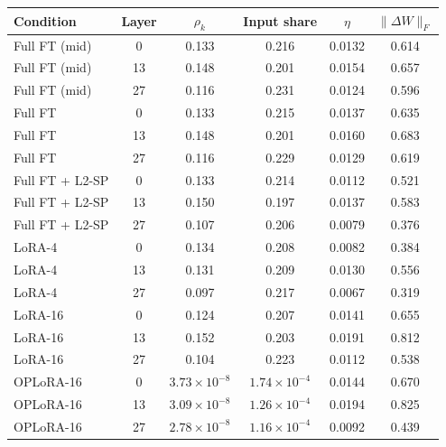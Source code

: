 \begin{tabular}{lccccc}
\toprule
Condition & Layer & $\rho_k$ & Input share & $\eta$ & $\lVert\Delta W\rVert_F$ \\
\midrule
Full FT (mid) & 0 & 0.133 & 0.216 & 0.0132 & 0.614 \\
Full FT (mid) & 13 & 0.148 & 0.201 & 0.0154 & 0.657 \\
Full FT (mid) & 27 & 0.116 & 0.231 & 0.0124 & 0.596 \\
Full FT & 0 & 0.133 & 0.215 & 0.0137 & 0.635 \\
Full FT & 13 & 0.148 & 0.201 & 0.0160 & 0.683 \\
Full FT & 27 & 0.116 & 0.229 & 0.0129 & 0.619 \\
Full FT + L2-SP & 0 & 0.133 & 0.214 & 0.0112 & 0.521 \\
Full FT + L2-SP & 13 & 0.150 & 0.197 & 0.0137 & 0.583 \\
Full FT + L2-SP & 27 & 0.107 & 0.206 & 0.0079 & 0.376 \\
LoRA-4 & 0 & 0.134 & 0.208 & 0.0082 & 0.384 \\
LoRA-4 & 13 & 0.131 & 0.209 & 0.0130 & 0.556 \\
LoRA-4 & 27 & 0.097 & 0.217 & 0.0067 & 0.319 \\
LoRA-16 & 0 & 0.124 & 0.207 & 0.0141 & 0.655 \\
LoRA-16 & 13 & 0.152 & 0.203 & 0.0191 & 0.812 \\
LoRA-16 & 27 & 0.104 & 0.223 & 0.0112 & 0.538 \\
OPLoRA-16 & 0 & $3.73\times10^{-8}$ & $1.74\times10^{-4}$ & 0.0144 & 0.670 \\
OPLoRA-16 & 13 & $3.09\times10^{-8}$ & $1.26\times10^{-4}$ & 0.0194 & 0.825 \\
OPLoRA-16 & 27 & $2.78\times10^{-8}$ & $1.16\times10^{-4}$ & 0.0092 & 0.439 \\
\bottomrule
\end{tabular}